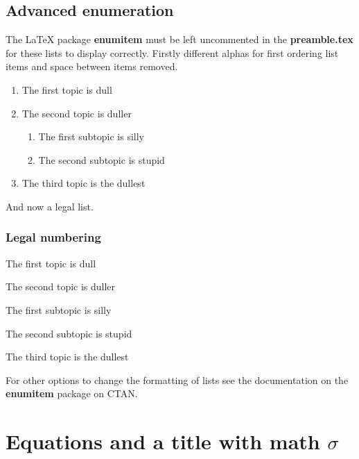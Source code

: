 \subsection*{Advanced enumeration}

The \LaTeX{} package \textbf{enumitem} must be left uncommented in the \textbf{preamble.tex} for these lists to display correctly. Firstly different alphas for first ordering list items and space between items removed.

\begin{enumerate}[label=\emph{\alph*}), noitemsep]
\item The first topic is dull
\item The second topic is duller
\begin{enumerate}[noitemsep]
\item The first subtopic is silly
\item The second subtopic is stupid
\end{enumerate}
\item The third topic is the dullest
\end{enumerate}

And now a legal list.

\subsubsection{Legal numbering}


\begin{legal}
\item The first topic is dull
\item The second topic is duller
\begin{legal}
\item The first subtopic is silly
\item The second subtopic is stupid
\end{legal}
\item The third topic is the dullest
\end{legal}

For other options to change the formatting of lists see the documentation on the \textbf{enumitem} package on CTAN.

\section{Equations and a title with math \texorpdfstring{$\sigma$}{[sigma]}} 

